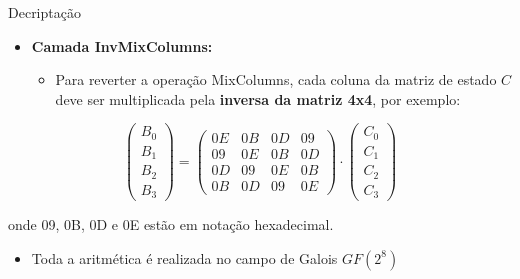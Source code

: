 \documentclass{beamer}
\begin{document}

\begin{frame}{Decriptação}

\begin{itemize}
    \item \textbf{Camada InvMixColumns:}
    \begin{itemize}
        \item Para reverter a operação MixColumns, cada coluna da matriz de estado $C$ deve ser multiplicada pela \textbf{inversa da matriz 4x4}, por exemplo:
    \end{itemize}
\end{itemize}

\[
\begin{pmatrix}
B_0 \\
B_1 \\
B_2 \\
B_3
\end{pmatrix}
=
\begin{pmatrix}
0E & 0B & 0D & 09 \\
09 & 0E & 0B & 0D \\
0D & 09 & 0E & 0B \\
0B & 0D & 09 & 0E
\end{pmatrix}
\cdot
\begin{pmatrix}
C_0 \\
C_1 \\
C_2 \\
C_3
\end{pmatrix}
\]

\vspace{0.5em}
onde 09, 0B, 0D e 0E estão em notação hexadecimal.

\begin{itemize}
    \item Toda a aritmética é realizada no campo de Galois $GF(2^8)$
\end{itemize}

\end{frame}

\end{document}

